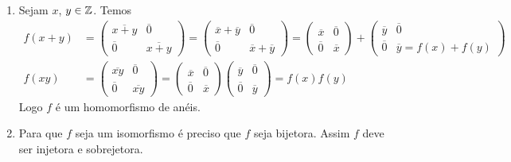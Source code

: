\documentclass[12pt]{exam}
\begin{document}
    \solucao
    \begin{enumerate}[label=({\alph*})]
        \item Sejam $x$, $y \in \mathbb{Z}$. Temos
        \begin{align*}
            f(x + y) &= \begin{pmatrix}
                \overline{x + y} & \overline{0}\\
                \overline{0} & \overline{x + y}
            \end{pmatrix} = \begin{pmatrix}
            \overline{x} + \overline{y} & \overline{0}\\
            \overline{0} & \overline{x} + \overline{y}
            \end{pmatrix} = \begin{pmatrix}
            \overline{x} & \overline{0}\\
            \overline{0} & \overline{x}
            \end{pmatrix} + \begin{pmatrix}
            \overline{y} & \overline{0}\\
            \overline{0} & \overline{y} = f(x) + f(y)
            \end{pmatrix}\\
            f(xy) &= \begin{pmatrix}
                \overline{xy} & \overline{0}\\
                \overline{0} & \overline{xy}
            \end{pmatrix} =
            \begin{pmatrix}
                \overline{x} & \overline{0}\\
                \overline{0} & \overline{x}
            \end{pmatrix}\begin{pmatrix}
                \overline{y} & \overline{0}\\
                \overline{0} & \overline{y}
            \end{pmatrix} = f(x)f(y)
        \end{align*}
        Logo $f$ é um homomorfismo de anéis.

        \item Para que $f$ seja um isomorfismo é preciso que $f$ seja bijetora. Assim $f$ deve ser injetora e sobrejetora.


\end{enumerate}
\end{document}
